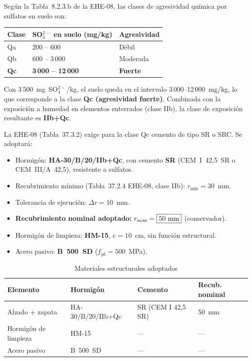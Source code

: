 \begin{notabox}
  Según la Tabla~8.2.3.b de la EHE-08, las clases de agresividad
  química por sulfatos en suelo son:

  \begin{center}
  \small
  \begin{tabular}{lll}
    \toprule
    \textbf{Clase} & \textbf{SO$_4^{2-}$ en suelo (mg/kg)}
    & \textbf{Agresividad} \\
    \midrule
    Qa & 200 – 600   & Débil \\
    Qb & 600 – 3\,000 & Moderada \\
    \textbf{Qc} & \textbf{3\,000 – 12\,000} & \textbf{Fuerte} \\
    \bottomrule
  \end{tabular}
  \end{center}

  Con $3\,500$~mg~SO$_4^{2-}$/kg, el suelo queda en el intervalo
  3\,000–12\,000~mg/kg, lo que corresponde a la clase
  \textbf{Qc (agresividad fuerte)}. Combinada con la exposición
  a humedad en elementos enterrados (clase IIb), la clase de
  exposición resultante es \textbf{IIb+Qc}.

  La EHE-08 (Tabla~37.3.2) exige para la clase Qc cemento de tipo SR
  o SRC. Se adoptará:
  \begin{itemize}
    \item Hormigón: \textbf{HA-30/B/20/IIb+Qc}, con cemento
          \textbf{SR} (CEM~I~42{,}5~SR o CEM~III/A~42{,}5),
          resistente a sulfatos.
    \item Recubrimiento mínimo (Tabla~37.2.4 EHE-08, clase IIb):
          $r_{\min} = 30$~mm.
    \item Tolerancia de ejecución: $\Delta r = 10$~mm.
    \item \textbf{Recubrimiento nominal adoptado:}
          $r_{\text{nom}} = \boxed{50~\text{mm}}$ (conservador).
    \item Hormigón de limpieza: \textbf{HM-15}, $e = 10$~cm,
          sin función estructural.
    \item Acero pasivo: \textbf{B~500~SD} ($f_{yk} = 500$~MPa).
  \end{itemize}
\end{notabox}

\begin{table}[H]
  \centering
  \caption{Materiales estructurales adoptados}
  \label{tab:materiales_muro}
  \begin{tabular}{@{}llll@{}}
    \toprule
    \textbf{Elemento} & \textbf{Hormigón} & \textbf{Cemento}
    & \textbf{Recub. nominal} \\
    \midrule
    Alzado + zapata     & HA-30/B/20/IIb+Qc & SR (CEM I 42{,}5 SR) & 50~mm \\
    Hormigón de limpieza & HM-15             & —                     & —     \\
    Acero pasivo         & B~500~SD          & —                     & —     \\
    \bottomrule
  \end{tabular}
\end{table}

